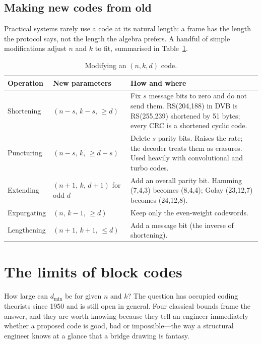 \subsection{Making new codes from old}

Practical systems rarely use a code at its natural length: a frame has the length the protocol
says, not the length the algebra prefers. A handful of simple modifications adjust $n$ and $k$ to
fit, summarised in Table~\ref{tab:ch14:modify}.

\begin{table}[htbp]\centering\small
\caption{Modifying an $(n,k,d)$ code.}
\label{tab:ch14:modify}
\begin{tabularx}{\linewidth}{@{}l l X@{}}
\toprule
Operation & New parameters & How and where\\
\midrule
Shortening & $(n-s,\,k-s,\,\ge d)$ & Fix $s$ message bits to zero and do not send them. RS(204,188) in DVB is RS(255,239) shortened by 51 bytes; every CRC is a shortened cyclic code.\\
Puncturing & $(n-s,\,k,\,\ge d-s)$ & Delete $s$ parity bits. Raises the rate; the decoder treats them as erasures. Used heavily with convolutional and turbo codes.\\
Extending & $(n+1,\,k,\,d+1)$ for odd $d$ & Add an overall parity bit. Hamming (7,4,3) becomes (8,4,4); Golay (23,12,7) becomes (24,12,8).\\
Expurgating & $(n,\,k-1,\,\ge d)$ & Keep only the even-weight codewords.\\
Lengthening & $(n+1,\,k+1,\,\le d)$ & Add a message bit (the inverse of shortening).\\
\bottomrule
\end{tabularx}
\end{table}

\section{The limits of block codes}
\label{sec:ch14:bounds}

How large can $d_{\min}$ be for given $n$ and $k$? The question has occupied coding theorists
since 1950 and is still open in general. Four classical bounds frame the answer, and they are
worth knowing because they tell an engineer immediately whether a proposed code is good, bad or
impossible---the way a structural engineer knows at a glance that a bridge drawing is fantasy.

